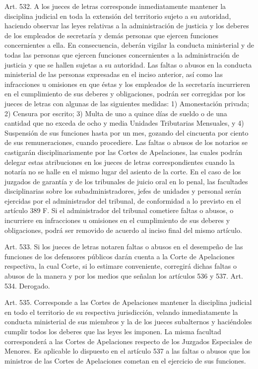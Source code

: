     Art. 532. A los jueces de letras corresponde inmediatamente mantener la disciplina judicial en toda la extensión del territorio sujeto a su autoridad, haciendo observar las leyes relativas a la administración de justicia y los deberes de los empleados de secretaría y demás personas que ejercen funciones concernientes a ella.
    En consecuencia, deberán vigilar la conducta ministerial y de todas las personas que ejercen funciones concernientes a la administración de justicia y que se hallen sujetas a su autoridad.
    Las faltas o abusos en la conducta ministerial de las personas expresadas en el inciso anterior, así como las infracciones u omisiones en que éstas y los empleados de la secretaría incurrieren en el cumplimiento de sus deberes y obligaciones, podrán ser corregidas por los jueces de letras con algunas de las siguientes medidas:
    1) Amonestación privada;
    2) Censura por escrito;
    3) Multa de uno a quince días de sueldo o de una cantidad que no exceda de ocho y media Unidades Tributarias Mensuales, y
    4) Suspensión de sus funciones hasta por un mes, gozando del cincuenta por ciento de sus remuneraciones, cuando procediere.
    Las faltas o abusos de los notarios se castigarán disciplinariamente por las Cortes de Apelaciones, las cuales podrán delegar estas atribuciones en los jueces de letras correspondientes cuando la notaría no se halle en el mismo lugar del asiento de la corte.
    En el caso de los juzgados de garantía y de los tribunales de juicio oral en lo penal, las facultades disciplinarias sobre los subadministradores, jefes de unidades y personal serán ejercidas por el administrador del tribunal, de conformidad a lo previsto en el artículo 389 F. Si el administrador del tribunal cometiere faltas o abusos, o incurriere en infracciones u omisiones en el cumplimiento de sus deberes y obligaciones, podrá ser removido de acuerdo al inciso final del mismo artículo.


    Art. 533. Si los jueces de letras notaren faltas o abusos en el desempeño de las funciones de los defensores públicos darán cuenta a la Corte de Apelaciones respectiva, la cual Corte, si lo estimare conveniente, corregirá dichas faltas o abusos de la manera y por los medios que señalan los artículos 536 y 537.
    Art. 534. Derogado.

    Art. 535. Corresponde a las Cortes de Apelaciones mantener la disciplina judicial en todo el territorio de su respectiva jurisdicción, velando inmediatamente la conducta ministerial de sus miembros y la de los jueces subalternos y haciéndoles cumplir todos los deberes que las leyes les imponen.
    La misma facultad corresponderá a las Cortes de Apelaciones respecto de los Juzgados Especiales de Menores.
    Es aplicable lo dispuesto en el artículo 537 a las faltas o abusos que los ministros de las Cortes de Apelaciones cometan en el ejercicio de sus funciones.



